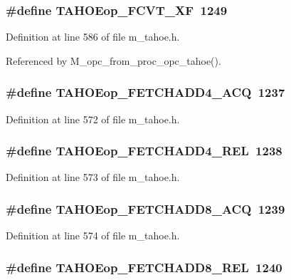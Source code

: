 \subsubsection{\setlength{\rightskip}{0pt plus 5cm}\#define TAHOEop\_\-FCVT\_\-XF~1249}\label{m__tahoe_8h_96267314e8c695495d4a81fa5151a414}




Definition at line 586 of file m\_\-tahoe.h.

Referenced by M\_\-opc\_\-from\_\-proc\_\-opc\_\-tahoe().
\subsubsection{\setlength{\rightskip}{0pt plus 5cm}\#define TAHOEop\_\-FETCHADD4\_\-ACQ~1237}\label{m__tahoe_8h_b710da5ca5a875c5c4ad26e67faa612a}




Definition at line 572 of file m\_\-tahoe.h.
\subsubsection{\setlength{\rightskip}{0pt plus 5cm}\#define TAHOEop\_\-FETCHADD4\_\-REL~1238}\label{m__tahoe_8h_39e1f1c2516fdca11aaf1bd2fdb5c7f0}




Definition at line 573 of file m\_\-tahoe.h.
\subsubsection{\setlength{\rightskip}{0pt plus 5cm}\#define TAHOEop\_\-FETCHADD8\_\-ACQ~1239}\label{m__tahoe_8h_22ae78fbdb75abdc544e97332231ce57}




Definition at line 574 of file m\_\-tahoe.h.
\subsubsection{\setlength{\rightskip}{0pt plus 5cm}\#define TAHOEop\_\-FETCHADD8\_\-REL~1240}\label{m__tahoe_8h_c9b14027b54ea73c3827223a9096ed12}




